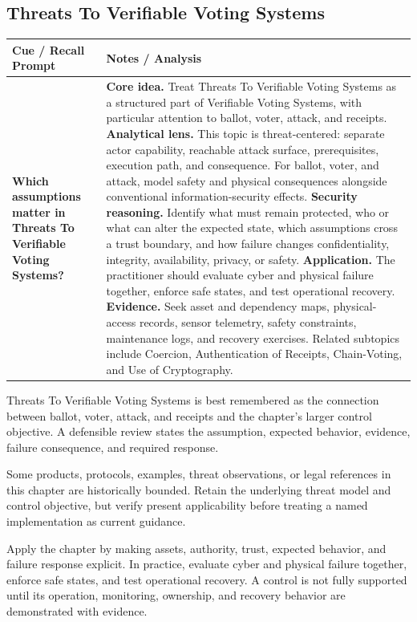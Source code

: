 \documentclass[11pt]{article}
\newcommand{\CornellHeader}{%
\rowcolor{Navy}\color{white}\bfseries Cue / Recall Prompt & \color{white}\bfseries Notes / Analysis\\\hline}
\newcommand{\CornellRow}[2]{%
\cellcolor{CueGray}\RaggedRight\textbf{#1} & \RaggedRight #2\\\hline}
\begin{document}
\subsection*{Threats To Verifiable Voting Systems}
\begin{longtable}{>{\RaggedRight\arraybackslash}p{}|>{\RaggedRight\arraybackslash}p{}}
\CornellHeader
\CornellRow{Which assumptions matter in Threats To Verifiable Voting Systems?}{\textbf{Core idea.} Treat Threats To Verifiable Voting Systems as a structured part of Verifiable Voting Systems, with particular attention to ballot, voter, attack, and receipts. \textbf{Analytical lens.} This topic is threat-centered: separate actor capability, reachable attack surface, prerequisites, execution path, and consequence. For ballot, voter, and attack, model safety and physical consequences alongside conventional information-security effects. \textbf{Security reasoning.} Identify what must remain protected, who or what can alter the expected state, which assumptions cross a trust boundary, and how failure changes confidentiality, integrity, availability, privacy, or safety. \textbf{Application.} The practitioner should evaluate cyber and physical failure together, enforce safe states, and test operational recovery. \textbf{Evidence.} Seek asset and dependency maps, physical-access records, sensor telemetry, safety constraints, maintenance logs, and recovery exercises. Related subtopics include Coercion, Authentication of Receipts, Chain-Voting, and Use of Cryptography.}
\end{longtable}
\begin{topicsummary}
Threats To Verifiable Voting Systems is best remembered as the connection between ballot, voter, attack, and receipts and the chapter's larger control objective. A defensible review states the assumption, expected behavior, evidence, failure consequence, and required response.
\end{topicsummary}
\begin{historybox}
Some products, protocols, examples, threat observations, or legal references in this chapter are historically bounded. Retain the underlying threat model and control objective, but verify present applicability before treating a named implementation as current guidance.
\end{historybox}
\begin{defensebox}
Apply the chapter by making assets, authority, trust, expected behavior, and failure response explicit. In practice, evaluate cyber and physical failure together, enforce safe states, and test operational recovery. A control is not fully supported until its operation, monitoring, ownership, and recovery behavior are demonstrated with evidence.
\end{defensebox}
\end{document}
